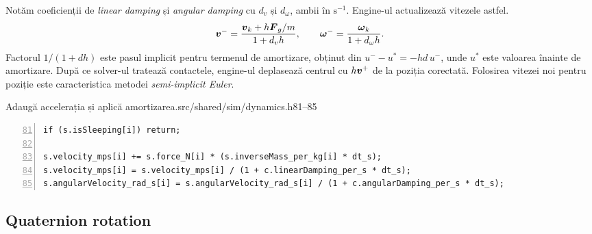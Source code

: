 \documentclass[11pt,a4paper]{article}
\begin{document}
Notăm coeficienții de \emph{linear damping} și \emph{angular damping}
cu \(d_v\) și \(d_\omega\), ambii în \(\mathrm{s^{-1}}\).
Engine-ul actualizează vitezele astfel.
\begin{equation}
 \boldsymbol{v}^-=\frac{\boldsymbol{v}_k+h\boldsymbol{F}_g/m}{1+d_vh},
 \qquad \boldsymbol{\omega}^-=\frac{\boldsymbol{\omega}_k}{1+d_\omega h}.
 \label{eq:integrare-viteze}
\end{equation}
Factorul \(1/(1+dh)\) este pasul implicit pentru termenul de
amortizare, obținut din \(u^- - u^\ast=-hd\,u^-\), unde \(u^\ast\)
este valoarea înainte de amortizare. După ce solver-ul tratează contactele,
engine-ul deplasează centrul cu \(h\boldsymbol{v}^+\) de la poziția
corectată. Folosirea vitezei noi pentru poziție este caracteristica
metodei \emph{semi-implicit Euler}.
\begin{codefragment}{Adaugă accelerația și aplică amortizarea.}{src/shared/sim/dynamics.h}{81--85}
\begin{lstlisting}[numbers=left,firstnumber=81]
if (s.isSleeping[i]) return;

s.velocity_mps[i] += s.force_N[i] * (s.inverseMass_per_kg[i] * dt_s);
s.velocity_mps[i] = s.velocity_mps[i] / (1 + c.linearDamping_per_s * dt_s);
s.angularVelocity_rad_s[i] = s.angularVelocity_rad_s[i] / (1 + c.angularDamping_per_s * dt_s);
\end{lstlisting}
\end{codefragment}

\subsection{Quaternion rotation}
\end{document}
